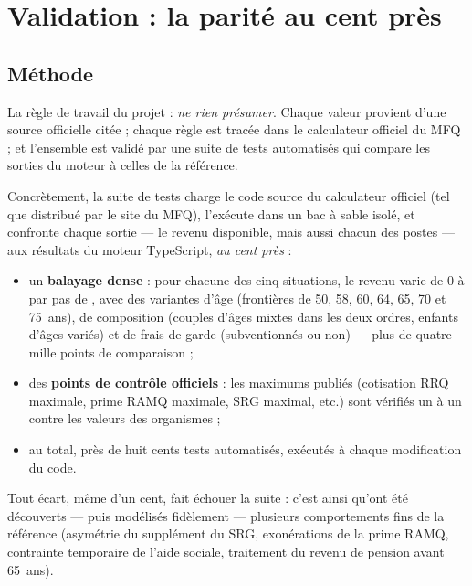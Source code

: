 \section{Validation : la parité au cent près}
\label{sec:validation}

\subsection{Méthode}

La règle de travail du projet : \emph{ne rien présumer}. Chaque valeur
provient d'une source officielle citée ; chaque règle est tracée dans le
calculateur officiel du MFQ ; et l'ensemble est validé par une suite de
tests automatisés qui compare les sorties du moteur à celles de la
référence.

Concrètement, la suite de tests charge le code source du calculateur
officiel (tel que distribué par le site du MFQ), l'exécute dans un bac à
sable isolé, et confronte chaque sortie --- le revenu disponible, mais
aussi chacun des postes --- aux résultats du moteur TypeScript, \emph{au
cent près} :

\begin{itemize}
  \item un \textbf{balayage dense} : pour chacune des cinq situations, le
        revenu varie de 0 à  par pas de , avec des
        variantes d'âge (frontières de 50, 58, 60, 64, 65, 70 et 75~ans),
        de composition (couples d'âges mixtes dans les deux ordres,
        enfants d'âges variés) et de frais de garde (subventionnés ou
        non) --- plus de quatre mille points de comparaison ;
  \item des \textbf{points de contrôle officiels} : les maximums publiés
        (cotisation RRQ maximale, prime RAMQ maximale, SRG maximal, etc.)
        sont vérifiés un à un contre les valeurs des organismes ;
  \item au total, près de huit cents tests automatisés, exécutés à chaque
        modification du code.
\end{itemize}

Tout écart, même d'un cent, fait échouer la suite : c'est ainsi qu'ont été
découverts --- puis modélisés fidèlement --- plusieurs comportements fins
de la référence (asymétrie du supplément du SRG, exonérations de la prime
RAMQ, contrainte temporaire de l'aide sociale, traitement du revenu de
pension avant 65~ans).

